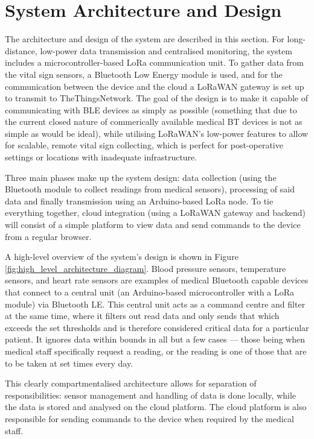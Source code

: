 \section{System Architecture and Design} %
The architecture and design of the system are described in this section. For long-distance, low-power data transmission and centralised monitoring, the system includes a microcontroller-based LoRa communication unit. To gather data from the vital sign sensors, a Bluetooth Low Energy module is used, and for the communication between the device and the cloud a LoRaWAN gateway is set up to transmit to TheThingsNetwork. The goal of the design is to make it capable of communicating with BLE devices as simply as possible (something that due to the current closed nature of commerically available medical BT devices is not as simple as would be ideal), while utilising LoRaWAN's low-power features to allow for scalable, remote vital sign collecting, which is perfect for post-operative settings or locations with inadequate infrastructure.

Three main phases make up the system design: data collection (using the Bluetooth module to collect readings from medical sensors), processing of said data and finally transmission using an Arduino-based LoRa node. To tie everything together, cloud integration (using a LoRaWAN gateway and backend) will consist of a simple platform to view data and send commands to the device from a regular browser.

A high-level overview of the system's design is shown in Figure \ref{fig:high_level_architecture_diagram}. Blood pressure sensors, temperature sensors, and heart rate sensors are examples of medical Bluetooth capable devices that connect to a central unit (an Arduino-based microcontroller with a LoRa module) via Bluetooth LE. This central unit acts as a command centre and filter at the same time, where it filters out read data and only sends that which exceeds the set thresholds and is therefore considered critical data for a particular patient. It ignores data within bounds in all but a few cases --- those being when medical staff specifically request a reading, or the reading is one of those that are to be taken at set times every day.

This clearly compartmentalised architecture allows for separation of responsibilities: sensor management and handling of data is done locally, while the data is stored and analysed on the cloud platform. The cloud platform is also responsible for sending commands to the device when required by the medical staff.

